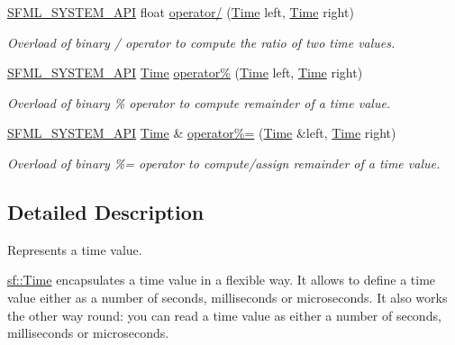\begin{DoxyCompactItemize}
\hyperlink{sfml_2dep_2_s_f_m_l-2_84_82_2include_2_s_f_m_l_2_system_2_export_8hpp_a6476c9e422606477a4c23d92b1d79a1f}{S\-F\-M\-L\-\_\-\-S\-Y\-S\-T\-E\-M\-\_\-\-A\-P\-I} float \hyperlink{classsf_1_1_time_ac3ae4f4d24a93e088d8e36d68322ea0f}{operator/} (\hyperlink{classsf_1_1_time}{Time} left, \hyperlink{classsf_1_1_time}{Time} right)
\begin{DoxyCompactList}\small\item\em Overload of binary / operator to compute the ratio of two time values. \end{DoxyCompactList}\item 
\hyperlink{sfml_2dep_2_s_f_m_l-2_84_82_2include_2_s_f_m_l_2_system_2_export_8hpp_a6476c9e422606477a4c23d92b1d79a1f}{S\-F\-M\-L\-\_\-\-S\-Y\-S\-T\-E\-M\-\_\-\-A\-P\-I} \hyperlink{classsf_1_1_time}{Time} \hyperlink{classsf_1_1_time_aafb8b12fb0ac0e366d6ea9c9e9f93335}{operator\%} (\hyperlink{classsf_1_1_time}{Time} left, \hyperlink{classsf_1_1_time}{Time} right)
\begin{DoxyCompactList}\small\item\em Overload of binary \% operator to compute remainder of a time value. \end{DoxyCompactList}\item 
\hyperlink{sfml_2dep_2_s_f_m_l-2_84_82_2include_2_s_f_m_l_2_system_2_export_8hpp_a6476c9e422606477a4c23d92b1d79a1f}{S\-F\-M\-L\-\_\-\-S\-Y\-S\-T\-E\-M\-\_\-\-A\-P\-I} \hyperlink{classsf_1_1_time}{Time} \& \hyperlink{classsf_1_1_time_af12dd271f14a17b58c9d737395e776d4}{operator\%=} (\hyperlink{classsf_1_1_time}{Time} \&left, \hyperlink{classsf_1_1_time}{Time} right)
\begin{DoxyCompactList}\small\item\em Overload of binary \%= operator to compute/assign remainder of a time value. \end{DoxyCompactList}\end{DoxyCompactItemize}


\subsection{Detailed Description}
Represents a time value. 

\hyperlink{classsf_1_1_time}{sf\-::\-Time} encapsulates a time value in a flexible way. It allows to define a time value either as a number of seconds, milliseconds or microseconds. It also works the other way round\-: you can read a time value as either a number of seconds, milliseconds or microseconds.

